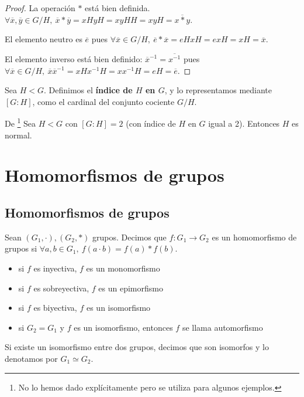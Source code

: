 \documentclass{book}
\theoremstyle{definition}
\theoremstyle{remark}
\newcommand{\inv}[1]{#1^{-1}}
\newcommand{\isom}{\simeq}
\begin{document}
\begin{proof}
	La operación $\ast$ está bien definida. $\forall \overline{x}, \overline{y} \in G/H,\ \overline{x} \ast \overline{y} = xHyH = xyHH = xyH = \overline{x \ast y}$.
	
	El elemento neutro es $\overline{e}$ pues $\forall \overline{x} \in G/H,\ \overline{e} \ast \overline{x} = eHxH = exH = xH = \overline{x}$.
	
	El elemento inverso está bien definido: $\inv{\overline{x}} = \overline{\inv{x}}$ pues $\forall \overline{x} \in G/H,\ \overline{x}\inv{\overline{x}} = xH \inv{x}H = x\inv{x}H = eH = \overline{e}$.
\end{proof}

\begin{dfn}[Índice]
	Sea $H < G$. Definimos el \textbf{índice de $H$ en $G$}, y lo representamos mediante $[G:H]$, como el cardinal del conjunto cociente $G/H$. \cite{dor96}
\end{dfn}

\begin{thm}
	\label{thm:indice2normal}
	De \cite{dor96}\footnote{No lo hemos dado explícitamente pero se utiliza para algunos ejemplos.}
	Sea $H < G$ con $[G : H] = 2$ (con índice de $H$ en $G$ igual a 2). Entonces $H$ es normal.
\end{thm}

\chapter{Homomorfismos de grupos}

\section{Homomorfismos de grupos}

\begin{dfn}
	Sean $(G_1, \cdot), (G_2, \ast)$ grupos. Decimos que $f: G_1 \to G_2$ es un homomorfismo de grupos si $\forall a,b \in G_1,\ f(a\cdot b) = f(a) \ast f(b)$.

	\begin{itemize}
		\item si $f$ es inyectiva, $f$ es un monomorfismo
		\item si $f$ es sobreyectiva, $f$ es un epimorfismo
		\item si $f$ es biyectiva, $f$ es un isomorfismo
		\item si $G_2 = G_1$ y $f$ es un isomorfismo, entonces $f$ se llama automorfismo
	\end{itemize}
	Si existe un isomorfismo entre dos grupos, decimos que son isomorfos y lo denotamos por $G_1 \isom G_2$.
\end{dfn}
\end{document}
